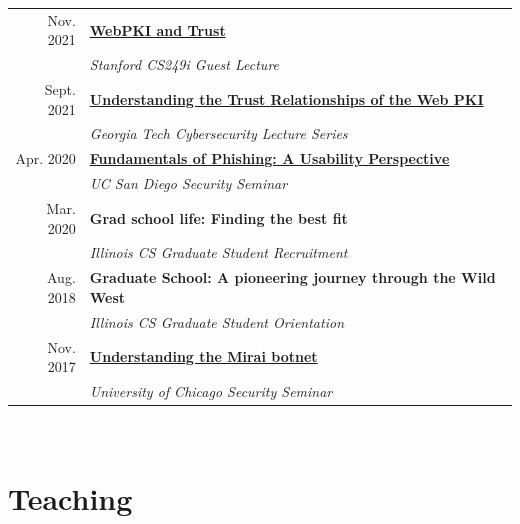 \documentclass[10pt,singlecolumn]{article} %
\begin{document}
\begin{tabular}{rl}
Nov. 2021 & \textbf{\href{https://zanema.com/slides/CS249i-WebPKI.pdf}{WebPKI and Trust}}\\
& \emph{Stanford CS249i Guest Lecture}\\

Sept. 2021 & \textbf{\href{https://zanema.com/slides/gt_lecture_trust.pdf}{Understanding the Trust Relationships of the Web PKI}}\\
& \emph{Georgia Tech Cybersecurity Lecture Series}\\

Apr. 2020 & \textbf{\href{https://zanema.com/slides/ucsd_phishing.pdf}{Fundamentals of Phishing: A Usability Perspective}}\\
& \emph{UC San Diego Security Seminar}\\

Mar. 2020 & \textbf{Grad school life: Finding the best fit}\\
& \emph{Illinois CS Graduate Student Recruitment}\\

Aug. 2018 & \textbf{Graduate School: A pioneering journey through the Wild West}\\
& \emph{Illinois CS Graduate Student Orientation}\\

Nov. 2017 & \textbf{\href{https://zanema.com/slides/uchicago_mirai.pdf}{Understanding the Mirai botnet}}\\
& \emph{University of Chicago Security Seminar}\\
\end{tabular} \\




\section{Teaching} 
\end{document}
